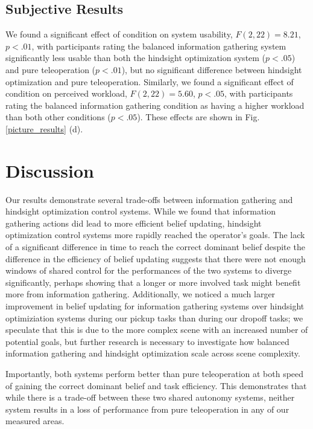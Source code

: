 \documentclass[conference]{IEEEtran}
\begin{document}
\subsection{Subjective Results}

We found a significant effect of condition on system usability, $F(2, 22) = 8.21$, $p < .01$, with participants rating the balanced information gathering system significantly less usable than both the hindsight optimization system ($p < .05$) and pure teleoperation ($p < .01$), but no significant difference between hindsight optimization and pure teleoperation. Similarly, we found a significant effect of condition on perceived workload, $F(2, 22) = 5.60$, $p < .05$, with participants rating the balanced information gathering condition as having a higher workload than both other conditions ($p < .05$). These effects are shown in Fig. \ref{picture_results} (d).

\section{Discussion}
Our results demonstrate several trade-offs between information gathering and hindsight optimization control systems. While we found that information gathering actions did lead to more efficient belief updating, hindsight optimization control systems more rapidly reached the operator's goals. The lack of a significant difference in time to reach the correct dominant belief despite the difference in the efficiency of belief updating suggests that there were not enough windows of shared control for the performances of the two systems to diverge significantly, perhaps showing that a longer or more involved task might benefit more from information gathering. Additionally, we noticed a much larger improvement in belief updating for information gathering systems over hindsight optimiziation systems during our pickup tasks than during our dropoff tasks; we speculate that this is due to the more complex scene with an increased number of potential goals, but further research is necessary to investigate how balanced information gathering and hindsight optimization scale across scene complexity.

Importantly, both systems perform better than pure teleoperation at both speed of gaining the correct dominant belief and task efficiency. This demonstrates that while there is a trade-off between these two shared autonomy systems, neither system results in a loss of performance from pure teleoperation in any of our measured areas.
\end{document}
